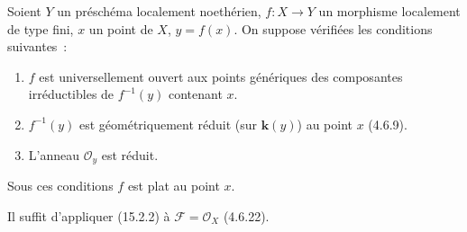 \begin{corollary}[15.2.3]
\label{IV.15.2.3-fr}
Soient $Y$ un préschéma localement noethérien, $f:X\to Y$ un morphisme localement
de type fini, $x$ un point de $X$, $y=f(x)$. On suppose vérifiées les conditions
suivantes~:
\begin{enumerate}[label=\textup{(\roman*)}]
  \item $f$ est universellement ouvert aux points génériques des composantes
  irréductibles de $f^{-1}(y)$ contenant $x$.
  \item $f^{-1}(y)$ est géométriquement réduit (sur $\boldsymbol{k}(y)$) au point
  $x$ \textup{(4.6.9)}.
  \item L'anneau $\mathcal O_y$ est réduit.
\end{enumerate}

Sous ces conditions $f$ est plat au point $x$.
\end{corollary}

Il suffit d'appliquer (15.2.2) à $\mathcal F=\mathcal O_X$ (4.6.22).

